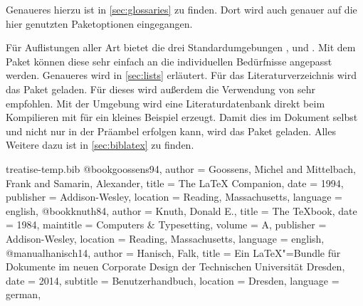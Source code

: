 \documentclass[%
  english,ngerman,%
  geometry=no,DIV=12,automark,%
]{tudscrartcl}
\begin{document}
Genaueres hierzu ist in \autoref{sec:glossaries} zu finden. Dort wird auch 
genauer auf die hier genutzten Paketoptionen eingegangen.
%
\begin{Excerpt*}
\usepackage[%
  automake,%
  acronym,%
  symbols,%
  nomain,%
  translate=babel,%
  nogroupskip,%
  toc,%
  section=chapter,%
]{glossaries}
\makeglossaries
\end{Excerpt*}
%
Für Auflistungen aller Art bietet  die drei Standardumgebungen 
,  und . 
Mit dem Paket  können diese sehr einfach an die individuellen 
Bedürfnisse angepasst werden. Genaueres wird in \autoref{sec:lists} erläutert.
%
Für das Literaturverzeichnis wird das Paket  geladen. Für 
dieses wird außerdem die Verwendung von  sehr empfohlen. Mit 
der Umgebung  wird eine Literaturdatenbank 
 direkt beim Kompilieren mit  für ein 
kleines Beispiel erzeugt. Damit dies im Dokument selbst und nicht nur in der 
Präambel erfolgen kann, wird das Paket  geladen. Alles 
Weitere dazu ist in \autoref{sec:biblatex} zu finden.
%
\begin{Excerpt*}
\usepackage{csquotes}
\usepackage[backend=biber,style=alphabetic]{biblatex}
\usepackage{filecontents}
\begin{filecontents}{treatise-temp.bib}
@book{goossens94,
  author    = {Goossens, Michel and Mittelbach, Frank
               and Samarin, Alexander},
  title     = {The LaTeX Companion},
  date      = {1994},
  publisher = {Addison-Wesley},
  location  = {Reading, Massachusetts},
  language  = {english},
}
@book{knuth84,
  author    = {Knuth, Donald E.},
  title     = {The \TeX book},
  date      = {1984},
  maintitle = {Computers \& Typesetting},
  volume    = {A},
  publisher = {Addison-Wesley},
  location  = {Reading, Massachusetts},
  language  = {english},
}
@manual{hanisch14,
  author    = {Hanisch, Falk},
  title     = {Ein \LaTeX"=Bundle für Dokumente
               im neuen Corporate Design 
               der Technischen Universität Dresden},
  date      = {2014},
  subtitle  = {Benutzerhandbuch},
  location  = {Dresden},
  language  = {german},
}
\end{filecontents}
\end{Excerpt*}
%
\begin{Excerpt*}

\end{Excerpt*}
\end{document}
